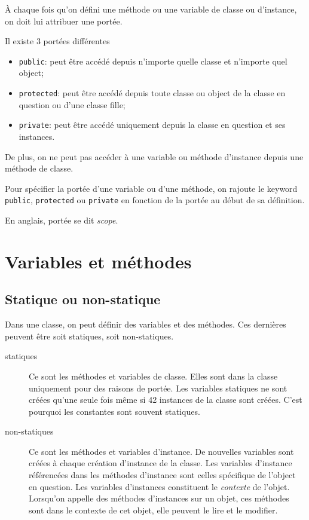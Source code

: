 À chaque fois qu'on défini une méthode ou une variable de classe ou
d'instance, on doit lui attribuer une portée.

Il existe 3 portées différentes
\begin{itemize}
  \item \lstinline|public|: peut être accédé depuis n'importe quelle
    classe et n'importe quel object;
  \item \lstinline|protected|: peut être accédé depuis toute classe ou object
    de la classe en question ou d'une classe fille; %
  \item \lstinline|private|: peut être accédé uniquement depuis la classe
    en question et ses instances.
\end{itemize}

De plus, on ne peut pas accéder à une variable ou méthode d'instance
depuis une méthode de classe.

Pour spécifier la portée d'une variable ou d'une méthode, on rajoute le keyword
\lstinline|public|, \lstinline|protected| ou \lstinline|private| en fonction
de la portée au début de sa définition.

En anglais, portée se dit \emph{scope}.

\section{Variables et méthodes}
\label{sec:varmeth}
\subsection{Statique ou non-statique}
Dans une classe, on peut définir des variables et des méthodes.
Ces dernières peuvent être soit statiques, soit non-statiques.
\begin{description}
  \item[statiques] Ce sont les méthodes et variables de classe.
    Elles sont dans la classe uniquement pour des raisons de portée.
    Les variables statiques ne sont créées qu'une seule fois même si
    42 instances de la classe sont créées.
    C'est pourquoi les constantes sont souvent statiques.
  \item[non-statiques] Ce sont les méthodes et variables d'instance.
    De nouvelles variables sont créées à chaque création d'instance de
    la classe.
    Les variables d'instance référencées dans les méthodes d'instance
    sont celles spécifique de l'object en question.
    Les variables d'instances constituent le \emph{contexte} de l'objet.
    Lorsqu'on appelle des méthodes d'instances sur un objet, ces méthodes
    sont dans le contexte de cet objet, elle peuvent le lire et le modifier.
\end{description}

